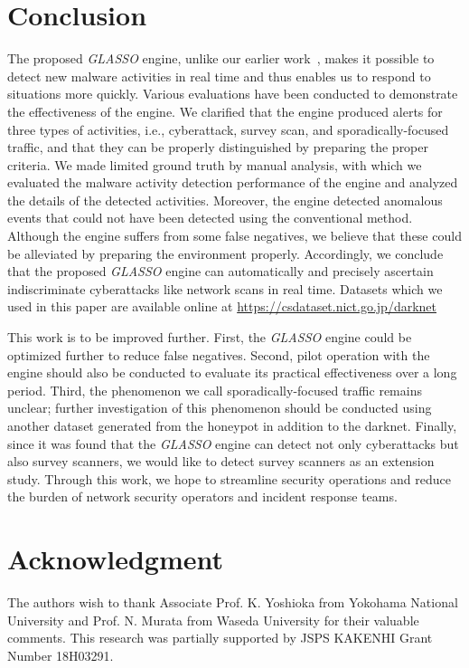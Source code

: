 \documentclass[conference]{IEEEtran}
\begin{document}
\section{Conclusion}
The proposed \textit{GLASSO} engine, unlike our earlier work~\cite{Han}, makes it possible to detect new malware activities in real time and thus enables us to respond to situations more quickly.
Various evaluations have been conducted to demonstrate the effectiveness of the engine.
We clarified that the engine produced alerts for three types of activities, i.e., cyberattack, survey scan, and sporadically-focused traffic, and that they can be properly distinguished by preparing the proper criteria.
We made limited ground truth by manual analysis, with which we evaluated the malware activity detection performance of the engine and analyzed the details of the detected activities.
Moreover, the engine detected anomalous events that could not have been detected using the conventional method.
Although the engine suffers from some false negatives, we believe that these could be alleviated by preparing the environment properly.
Accordingly, we conclude that the proposed \textit{GLASSO} engine can automatically and precisely ascertain indiscriminate cyberattacks like network scans in real time.
Datasets which we used in this paper are available online at \url{https://csdataset.nict.go.jp/darknet}

This work is to be improved further.
First, the \textit{GLASSO} engine could be optimized further to reduce false negatives.
Second, pilot operation with the engine should also be conducted to evaluate its practical effectiveness over a long period.
Third, the phenomenon we call sporadically-focused traffic remains unclear; further investigation of this phenomenon should be conducted using another dataset generated from the honeypot in addition to the darknet.
Finally, since it was found that the \textit{GLASSO} engine can detect not only cyberattacks but also survey scanners, we would like to detect survey scanners as an extension study.
Through this work, we hope to streamline security operations and reduce the burden of network security operators and incident response teams.




\section*{Acknowledgment}
{\small The authors wish to thank Associate Prof. K. Yoshioka from Yokohama National University and  Prof. N. Murata from Waseda University for their valuable comments.
This research was partially supported by JSPS KAKENHI Grant Number 18H03291.}
\end{document}
